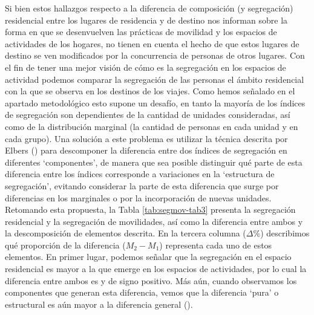 \documentclass[
  spanish,
  a4paper,%
  chapterprefix=true,%
  DIV=calc,%
  twoside]{scrbook}%
\begin{document}
Si bien estos hallazgos respecto a la diferencia de composición (y
segregación) residencial entre los lugares de residencia y de destino
nos informan sobre la forma en que se desenvuelven las prácticas de
movilidad y los espacios de actividades de los hogares, no tienen en
cuenta el hecho de que estos lugares de destino se ven modificados por
la concurrencia de personas de otros lugares.
Con el fin de tener
una mejor visión de cómo es la segregación en los espacios de actividad
podemos comparar la segregación de las personas el ámbito residencial
con la que se observa en los destinos de los viajes. Como hemos señalado
en el apartado metodológico esto supone un desafío, en tanto la mayoría
de los índices de segregación son dependientes de la cantidad de
unidades consideradas, así como de la distribución marginal (la cantidad
de personas en cada unidad y en cada grupo). Una solución a este
problema es utilizar la técnica descrita por Elbers () para
descomponer la diferencia entre dos índices de segregación en diferentes
`componentes', de manera que sea posible distinguir qué parte de esta
diferencia entre los índices corresponde a variaciones en la `estructura
de segregación', evitando considerar la parte de esta diferencia que
surge por diferencias en los marginales o por la incorporación de nuevas
unidades. Retomando esta propuesta, la Tabla \ref{tab:segmov-tab3}
presenta la segregación residencial y la segregación de movilidades, así
como la diferencia entre ambos y la descomposición de elementos
descrita. En la tercera columna (\(\Delta \%\)) describimos qué proporción
de la diferencia (\(M_2 - M_1\)) representa cada uno de estos elementos.
En primer lugar, podemos señalar que la segregación en el espacio
residencial es mayor a la que emerge en los espacios de actividades, por
lo cual la diferencia entre ambos es
 y de signo positivo. Más aún,
cuando observamos los componentes que generan esta diferencia, vemos que
la diferencia `pura' o estructural es aún mayor a la diferencia general
().
\end{document}
